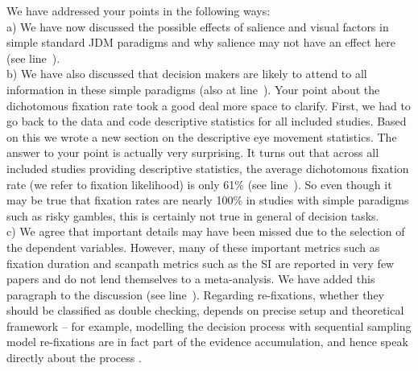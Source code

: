 We have addressed your points in the following ways:\\
a) We have now discussed the possible effects of salience and visual factors in simple standard JDM paradigms and why salience may not have an effect here (see line~).\\ 
b) We have also discussed that decision makers are likely to attend to all information in these simple paradigms (also at line~). Your point about the dichotomous fixation rate took a good deal more space to clarify. First, we had to go back to the data and code descriptive statistics for all included studies. Based on this we wrote a new section on the descriptive eye movement statistics. The answer to your point is actually very surprising. It turns out that across all included studies providing descriptive statistics, the average dichotomous fixation rate (we refer to fixation likelihood) is only 61\% (see line~). So even though it may be true that fixation rates are nearly 100\% in studies with simple paradigms such as risky gambles, this is certainly not true in general of decision tasks.\\ 
c) We agree that important details may have been missed due to the selection of the dependent variables. However, many of these important metrics such as fixation duration and scanpath metrics such as the SI are reported in very few papers and do not lend themselves to a meta-analysis. We have added this paragraph to the discussion (see line~). Regarding re-fixations, whether they should be classified as double checking, depends on precise setup and theoretical framework -- for example, modelling the decision process with sequential sampling model re-fixations are in fact part of the evidence accumulation, and hence speak directly about the process \citep[e.g.][]{krajbich2010a}. 



